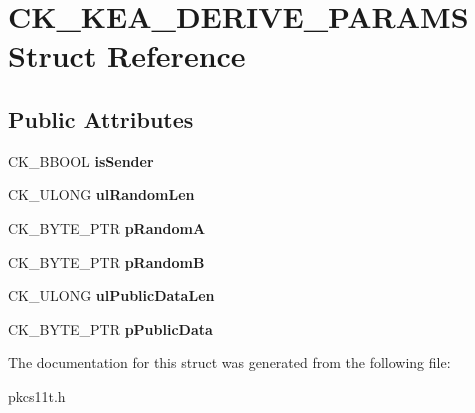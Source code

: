 \hypertarget{struct_c_k___k_e_a___d_e_r_i_v_e___p_a_r_a_m_s}{}\section{C\+K\+\_\+\+K\+E\+A\+\_\+\+D\+E\+R\+I\+V\+E\+\_\+\+P\+A\+R\+A\+MS Struct Reference}
\label{struct_c_k___k_e_a___d_e_r_i_v_e___p_a_r_a_m_s}
\subsection*{Public Attributes}
\begin{DoxyCompactItemize}
\item 
\mbox{\label{struct_c_k___k_e_a___d_e_r_i_v_e___p_a_r_a_m_s_af0877d5766fe83380e61e44ffa913c28}} 
C\+K\+\_\+\+B\+B\+O\+OL {\bfseries is\+Sender}
\item 
\mbox{\label{struct_c_k___k_e_a___d_e_r_i_v_e___p_a_r_a_m_s_a262da7e616b091eb5287cd0c04334c21}} 
C\+K\+\_\+\+U\+L\+O\+NG {\bfseries ul\+Random\+Len}
\item 
\mbox{\label{struct_c_k___k_e_a___d_e_r_i_v_e___p_a_r_a_m_s_a5c0c4f6be3ecb7ee67527cbbd282e3f0}} 
C\+K\+\_\+\+B\+Y\+T\+E\+\_\+\+P\+TR {\bfseries p\+RandomA}
\item 
\mbox{\label{struct_c_k___k_e_a___d_e_r_i_v_e___p_a_r_a_m_s_a271ca66a7ee8901646bbce325f79693a}} 
C\+K\+\_\+\+B\+Y\+T\+E\+\_\+\+P\+TR {\bfseries p\+RandomB}
\item 
\mbox{\label{struct_c_k___k_e_a___d_e_r_i_v_e___p_a_r_a_m_s_ab5dc5d78b8ef7e9b47131a892724d147}} 
C\+K\+\_\+\+U\+L\+O\+NG {\bfseries ul\+Public\+Data\+Len}
\item 
\mbox{\label{struct_c_k___k_e_a___d_e_r_i_v_e___p_a_r_a_m_s_a78d21f7c6d0e1088469f8fee48088266}} 
C\+K\+\_\+\+B\+Y\+T\+E\+\_\+\+P\+TR {\bfseries p\+Public\+Data}
\end{DoxyCompactItemize}


The documentation for this struct was generated from the following file\+:\begin{DoxyCompactItemize}
\item 
pkcs11t.\+h\end{DoxyCompactItemize}
